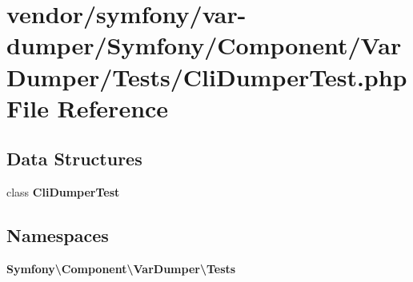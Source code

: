 \section{vendor/symfony/var-\/dumper/\+Symfony/\+Component/\+Var\+Dumper/\+Tests/\+Cli\+Dumper\+Test.php File Reference}
\label{_cli_dumper_test_8php}
\subsection*{Data Structures}
\begin{DoxyCompactItemize}
\item 
class {\bf Cli\+Dumper\+Test}
\end{DoxyCompactItemize}
\subsection*{Namespaces}
\begin{DoxyCompactItemize}
\item 
 {\bf Symfony\textbackslash{}\+Component\textbackslash{}\+Var\+Dumper\textbackslash{}\+Tests}
\end{DoxyCompactItemize}
